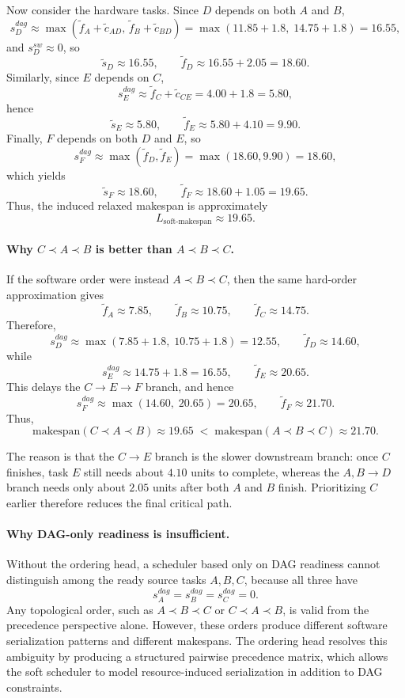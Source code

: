 Now consider the hardware tasks. Since \(D\) depends on both \(A\) and \(B\),
\begin{equation}
s_D^{dag}\approx \max(\tilde f_A+\tilde c_{AD},\,\tilde f_B+\tilde c_{BD})
=
\max(11.85+1.8,\;14.75+1.8)
=
16.55,
\end{equation}
and \(s_D^{sw}\approx 0\), so
\[
\tilde s_D\approx 16.55,\qquad
\tilde f_D\approx 16.55+2.05=18.60.
\]
Similarly, since \(E\) depends on \(C\),
\begin{equation}
s_E^{dag}\approx \tilde f_C+\tilde c_{CE}=4.00+1.8=5.80,
\end{equation}
hence
\[
\tilde s_E\approx 5.80,\qquad
\tilde f_E\approx 5.80+4.10=9.90.
\]
Finally, \(F\) depends on both \(D\) and \(E\), so
\begin{equation}
s_F^{dag}\approx \max(\tilde f_D,\tilde f_E)=\max(18.60,9.90)=18.60,
\end{equation}
which yields
\[
\tilde s_F\approx 18.60,\qquad
\tilde f_F\approx 18.60+1.05=19.65.
\]
Thus, the induced relaxed makespan is approximately
\[
L_{\mathrm{soft\mbox{-}makespan}} \approx 19.65.
\]

\paragraph{\textbf{Why \(C\prec A\prec B\) is better than \(A\prec B\prec C\).}}
If the software order were instead \(A\prec B\prec C\), then the same hard-order approximation gives
\[
\tilde f_A\approx 7.85,\qquad
\tilde f_B\approx 10.75,\qquad
\tilde f_C\approx 14.75.
\]
Therefore,
\[
s_D^{dag}\approx \max(7.85+1.8,\;10.75+1.8)=12.55,
\qquad
\tilde f_D\approx 14.60,
\]
while
\[
s_E^{dag}\approx 14.75+1.8=16.55,
\qquad
\tilde f_E\approx 20.65.
\]
This delays the \(C\rightarrow E\rightarrow F\) branch, and hence
\[
s_F^{dag}\approx \max(14.60,\;20.65)=20.65,
\qquad
\tilde f_F\approx 21.70.
\]
Thus,
\[
\mathrm{makespan}(C\prec A\prec B)\approx 19.65
\;<\;
\mathrm{makespan}(A\prec B\prec C)\approx 21.70.
\]

The reason is that the \(C\rightarrow E\) branch is the slower downstream branch: once \(C\) finishes, task \(E\) still needs about \(4.10\) units to complete, whereas the \(A,B\rightarrow D\) branch needs only about \(2.05\) units after both \(A\) and \(B\) finish. Prioritizing \(C\) earlier therefore reduces the final critical path.

\paragraph{\textbf{Why DAG-only readiness is insufficient.}}
Without the ordering head, a scheduler based only on DAG readiness cannot distinguish among the ready source tasks \(A,B,C\), because all three have
\[
s_A^{dag}=s_B^{dag}=s_C^{dag}=0.
\]
Any topological order, such as \(A\prec B\prec C\) or \(C\prec A\prec B\), is valid from the precedence perspective alone. However, these orders produce different software serialization patterns and different makespans. The ordering head resolves this ambiguity by producing a structured pairwise precedence matrix, which allows the soft scheduler to model resource-induced serialization in addition to DAG constraints.